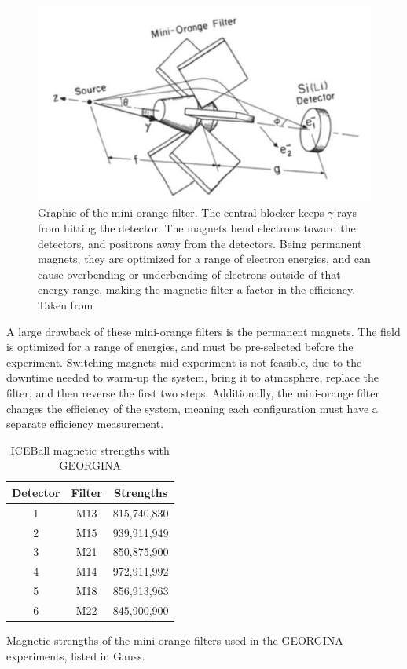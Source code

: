 \begin{figure}
    \centering
    \includegraphics[scale=0.6]{Setup_Figs/mini-orange-metlay-figure.pdf}
    \caption{Graphic of the mini-orange filter. The central blocker keeps $\gamma$-rays from hitting the detector. The magnets bend electrons toward the detectors, and positrons away from the detectors. Being permanent magnets, they are optimized for a range of electron energies, and can cause overbending or underbending of electrons outside of that energy range, making the magnetic filter a factor in the efficiency. Taken from \citep{metlay93:_iceball_comm}}
    \label{fig:mini_orange}
\end{figure}

A large drawback of these mini-orange filters is the permanent magnets. The field is optimized for a range of energies, and must be pre-selected before the experiment. Switching magnets mid-experiment is not feasible, due to the downtime needed to warm-up the system, bring it to atmosphere, replace the filter, and then reverse the first two steps. Additionally, the mini-orange filter changes the efficiency of the system, meaning each configuration must have a separate efficiency measurement.

\begin{table}[]
    \centering
    \caption{ICEBall magnetic strengths with GEORGINA}
    \begin{tabular}{c|c|c} \toprule
         Detector & Filter & Strengths \\
         \hline
         1 & M13 & 815,740,830 \\ 
         2 & M15 & 939,911,949\\
         3 & M21 & 850,875,900 \\
         4 & M14 & 972,911,992\\
         5 & M18 & 856,913,963\\
         6 & M22 & 845,900,900\\ \bottomrule
    \end{tabular}
    \footnotesize
    \item Magnetic strengths of the mini-orange filters used in the GEORGINA experiments, listed in Gauss. 
    \label{tab:ICE_Magnet}
\end{table}

